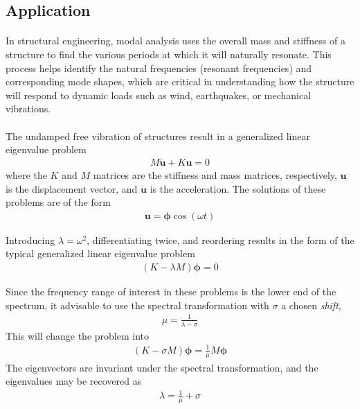 \subsection{Application}\label{chapt:application}
\paragraph*{}
In structural engineering, modal analysis uses the overall mass and stiffness of a structure to find the various periods at which it will naturally resonate. This process helps identify the natural frequencies (resonant frequencies) and corresponding mode shapes, which are critical in understanding how the structure will respond to dynamic loads such as wind, earthquakes, or mechanical vibrations.

\paragraph*{}
The undamped free vibration of structures result in a generalized linear eigenvalue problem
\begin{align}
    M \ddot{\mathbf{u}} + K \mathbf{u} = 0
\end{align}
where the $K$ and $M$ matrices are the stiffness and mass matrices, respectively, $\mathbf{u}$ is the displacement vector, and $\ddot{\mathbf{u}}$ is the acceleration. The solutions of these problems are of the form
\begin{align}
    \mathbf{u} = \boldsymbol{\phi} \cos(\omega t)
\end{align}

Introducing $\lambda = \omega^2$, differentiating twice, and reordering results in the form of the typical generalized linear eigenvalue problem
\begin{align}
    (K-\lambda M)\boldsymbol{\phi} = 0
\end{align}

Since the frequency range of interest in these problems is the lower end of the spectrum, it advisable to use the spectral transformation with $\sigma$ a chosen \textit{shift},
\begin{align} \label{eq:shift}
    \mu = \frac{1}{\lambda - \sigma}
\end{align}
This will change the problem into 
\begin{align}\label{eq:9}
    (K - \sigma M)\boldsymbol{\phi}=\frac{1}{\mu}M\boldsymbol\phi
\end{align}
The eigenvectors are invariant under the spectral transformation, and the eigenvalues may be recovered as
\begin{align}
    \lambda = \frac{1}{\mu} + \sigma
\end{align}

